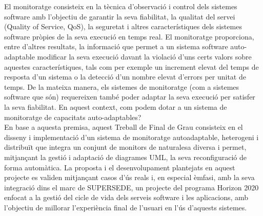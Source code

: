 \documentclass[
11pt, %
catalan, %
singlespacing, %
headsepline, %
table
]{MastersDoctoralThesis} %
\begin{document}
\begin{Abstracte}
El monitoratge consisteix en la tècnica d'observació i control dels sistemes software amb l'objectiu de garantir la seva fiabilitat, la qualitat del servei (Quality of Service, QoS), la seguretat i altres característiques dels sistemes software pròpies de la seva execució en temps real. El monitoratge proporciona, entre d'altres resultats, la informació que permet a un sistema software auto-adaptable modificar la seva execució davant la violació d'uns certs valors sobre aquestes característiques, tals com per exemple un increment elevat del temps de resposta d'un sistema o la detecció d'un nombre elevat d'errors per unitat de temps. De la mateixa manera, els sistemes de monitoratge (com a sistemes software que són) requereixen també poder adaptar la seva execució per satisfer la seva fiabilitat. En aquest context, com podem dotar a un sistema de monitoratge de capacitats auto-adaptables?\\

En base a aquesta premisa, aquest Treball de Final de Grau consisteix en el disseny i implementació d'un sistema de monitoratge autoadaptable, heterogeni i distribuït que integra un conjunt de monitors de naturalesa diversa i permet, mitjançant la gestió i adaptació de diagrames UML, la seva reconfiguració de forma automàtica. La proposta i el desenvolupament plantejats en aquest projecte es validen mitjançant casos d'ús reals i, en especial èmfasi, amb la seva integració dins el marc de SUPERSEDE, un projecte del programa Horizon 2020 enfocat a la gestió del cicle de vida dels serveis software i les aplicacions, amb l'objectiu de millorar l'experiència final de l'usuari en l'ús d'aquests sistemes. 
\end{Abstracte}



\end{document}
